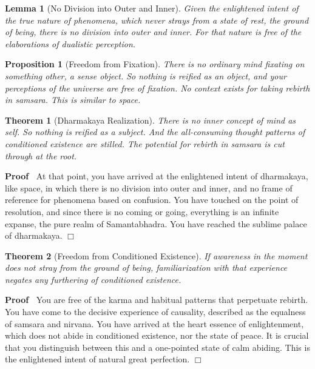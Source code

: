 \documentclass{article}
\newenvironment{proof}{\noindent\textbf{Proof\ }}{\hspace*{\fill}$\Box$\medskip}
\newtheorem{lemma}{Lemma}
\newtheorem{proposition}{Proposition}
{\theorembodyfont{\rmfamily}\newtheorem{remark}{Remark}}
\newtheorem{theorem}{Theorem}
\begin{document}
\begin{lemma}
  [No Division into Outer and Inner] Given the enlightened intent of the true
  nature of phenomena, which never strays from a state of rest, the ground of
  being, there is no division into outer and inner. For that nature is free of
  the elaborations of dualistic perception.
\end{lemma}

\begin{proposition}
  [Freedom from Fixation] There is no ordinary mind fixating on something
  other, a sense object. So nothing is reified as an object, and your
  perceptions of the universe are free of fixation. No context exists for
  taking rebirth in samsara. This is similar to space.
\end{proposition}

\begin{theorem}
  [Dharmakaya Realization] There is no inner concept of mind as self. So
  nothing is reified as a subject. And the all-consuming thought patterns of
  conditioned existence are stilled. The potential for rebirth in samsara is
  cut through at the root.
\end{theorem}

\begin{proof}
  At that point, you have arrived at the enlightened intent of dharmakaya,
  like space, in which there is no division into outer and inner, and no frame
  of reference for phenomena based on confusion. You have touched on the point
  of resolution, and since there is no coming or going, everything is an
  infinite expanse, the pure realm of Samantabhadra. You have reached the
  sublime palace of dharmakaya.
\end{proof}

\begin{theorem}
  [Freedom from Conditioned Existence] If awareness in the moment does not
  stray from the ground of being, familiarization with that experience negates
  any furthering of conditioned existence.
\end{theorem}

\begin{proof}
  You are free of the karma and habitual patterns that perpetuate rebirth. You
  have come to the decisive experience of causality, described as the
  equalness of samsara and nirvana. You have arrived at the heart essence of
  enlightenment, which does not abide in conditioned existence, nor the state
  of peace. It is crucial that you distinguish between this and a one-pointed
  state of calm abiding. This is the enlightened intent of natural great
  perfection.
\end{proof}
\end{document}
